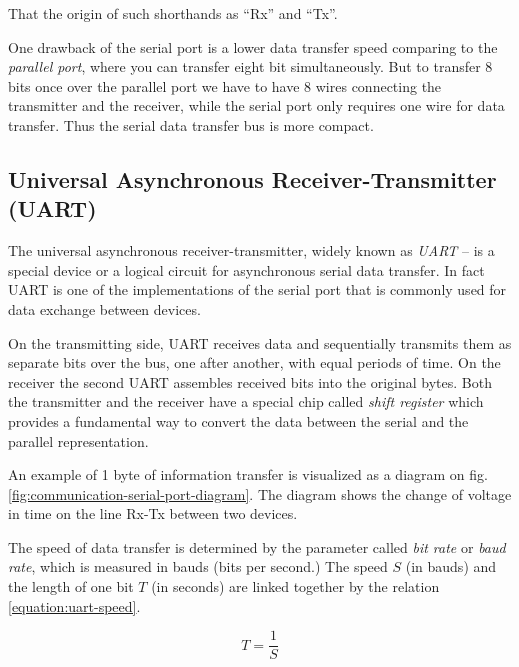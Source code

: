 \documentclass[../sparc.tex]{subfiles}
\begin{document}
That the origin of such shorthands as ``Rx'' and ``Tx''.\autocite{so:krisw}

One drawback of the serial port is a lower data transfer speed comparing to the
\emph{parallel port}, where you can transfer eight bit simultaneously.  But to
transfer 8 bits once over the parallel port we have to have 8 wires connecting
the transmitter and the receiver, while the serial port only requires one wire
for data transfer.  Thus the serial data transfer bus is more compact.

\subsection{Universal Asynchronous Receiver-Transmitter (UART)}
\label{section:communication-uart}

The universal asynchronous receiver-transmitter, widely known as \emph{UART} --
is a special device or a logical circuit for asynchronous serial data transfer.
In fact UART is one of the implementations of the serial port that is commonly
used for data exchange between devices.

On the transmitting side, UART receives data and sequentially transmits them as
separate bits over the bus, one after another, with equal periods of time.  On
the receiver the second UART assembles received bits into the original bytes.
Both the transmitter and the receiver have a special chip called \emph{shift
register} which provides a fundamental way to convert the data between the
serial and the parallel representation.


An example of 1 byte of information transfer is visualized as a diagram on fig.
\ref{fig:communication-serial-port-diagram}.  The diagram shows the change of
voltage in time on the line Rx-Tx between two devices.


The speed of data transfer is determined by the parameter called \emph{bit rate}
or \emph{baud rate}, which is measured in bauds (bits per second.)  The speed
$S$ (in bauds) and the length of one bit $T$ (in seconds) are linked together by
the relation \ref{equation:uart-speed}.

\begin{equation}
  T = \frac{1}{S}
  \label{equation:uart-speed}
\end{equation}
\end{document}
